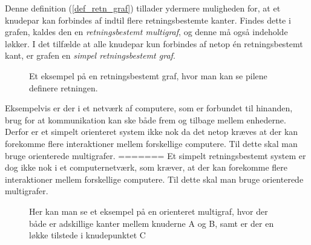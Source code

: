 \noindent Denne definition (\ref{def_retn_graf}) tillader ydermere muligheden for, at et knudepar kan forbindes af indtil flere retningsbestemte kanter. Findes dette i grafen, kaldes den en \textit{retningsbestemt multigraf}, og denne må også indeholde løkker. I det tilfælde at alle knudepar kun forbindes af netop én retningsbestemt kant, er grafen en \textit{simpel retningsbestemt graf}.


\begin{figure}[h]
\centering
\caption{Et eksempel på en retningsbestemt graf, hvor man kan se pilene definere retningen.}
\end{figure}

\noindent Eksempelvis er der i et netværk af computere, som er forbundet til hinanden, brug for at kommunikation kan ske både frem og tilbage mellem enhederne. Derfor er et simpelt orienteret system ikke nok da det netop kræves at der kan forekomme flere interaktioner mellem forskellige computere. Til dette skal man bruge orienterede multigrafer.
=======
\noindent Et simpelt retningsbestemt system er dog ikke nok i et computernetværk, som kræver, at der kan forekomme flere interaktioner mellem forskellige computere. Til dette skal man bruge orienterede multigrafer.


\begin{figure}[h]
\centering
{}
\caption{Her kan man se et eksempel på en orienteret multigraf, hvor der både er adskillige kanter mellem knuderne A og B, samt er der en løkke tilstede i knudepunktet C }
\end{figure}


